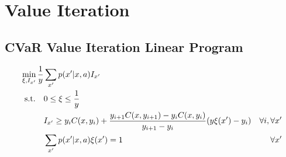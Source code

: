 \chapter{Value Iteration}\label{ch:appendix:vi}
\section{CVaR Value Iteration Linear Program}
\begin{equation}\label{eqn:cvarvilp}
\begin{split}
\min_{\xi, I_{x'}} \dfrac{1}{y} &\sum_{x'} p(x'|x, a) I_{x'}
\\
\textup{s.t.} \quad
&0 \le \xi \le \dfrac{1}{y}\\
&I_{x'} \ge y_iC(x,y_{i})+\frac{y_{i+1}C(x,y_{i+1})-y_iC(x,y_{i})}{y_{i+1}-y_i}(y\xi(x')-y_i) &\forall i, \forall x'\\
&\sum_{x'} p(x'|x, a)\xi(x') = 1 &\forall x'
\end{split}
\end{equation}

